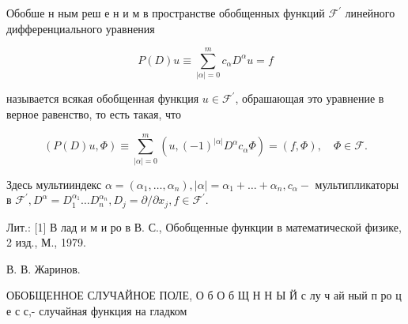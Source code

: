 \documentclass[10pt]{article}
\begin{document}
Обобше н ным реш е н и м в пространстве обобщенных функций $\mathscr{F}^{\prime}$ линейного дифференциального уравнения



\[

P(D) u \equiv \sum_{|\alpha|=0}^{m} c_{\alpha} D^{\alpha} u=f

\]



называется всякая обобщенная функция $u \in \mathscr{F}^{\prime}$, обрашающая это уравнение в верное равенство, то есть такая, что



\[

(P(D) u, \Phi) \equiv \sum_{|\alpha|=0}^{m}\left(u,(-1)^{|\alpha|} D^{\alpha} c_{\alpha} \Phi\right)=(f, \Phi), \quad \Phi \in \mathscr{F} .

\]



Здесь мультииндекс $\alpha=\left(\alpha_{1}, \ldots, \alpha_{n}\right),|\alpha|=\alpha_{1}+\ldots+\alpha_{n}, c_{\alpha}-$ мультипликаторы в $\mathscr{F}^{\prime}, D^{\alpha}=D_{1}^{\alpha_{1}} \ldots D_{n}^{\alpha_{n}}, D_{j}=\partial / \partial x_{j}, f \in \mathscr{F}^{\prime}$.



Лит.: [1] В лад и м и ро в В. С., Обобщенные функции в математической физике, 2 изд., М., 1979.



В. В. Жаринов.



ОБОБЩЕННОЕ СЛУЧАЙНОЕ ПОЛЕ, О б О б Щ Н Н Ы Й с лу ч ай ный п ро ц е с с,- случайная функция на гладком
\end{document}
